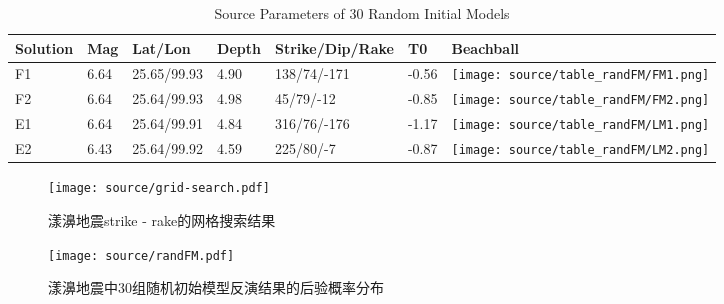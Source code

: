 \begin{table}[h]
    \centering
    \caption{Source Parameters of 30 Random Initial Models}
    \label{tab:yangbi-2}
      \centering%
      \begin{tabular}{m{1.5cm}<{\centering}m{1.5cm}<{\centering}m{2cm}<{\centering}m{1cm}<{\centering}m{2cm}<{\centering}m{1cm}<{\centering}m{2cm}<{\centering}}
  
      \toprule
      Solution   & Mag & Lat/Lon & Depth & Strike/Dip/Rake & T0 & Beachball    \\
  
      \midrule
      F1 & 6.64 & 25.65/99.93 & 4.90 & 138/74/-171 & -0.56 & \texttt{[image: source/table\_randFM/FM1.png]} \\
      
      F2 & 6.64 & 25.64/99.93 & 4.98 & 45/79/-12 & -0.85 & \texttt{[image: source/table\_randFM/FM2.png]} \\
      
      E1 & 6.64 & 25.64/99.91 & 4.84 & 316/76/-176 & -1.17 & \texttt{[image: source/table\_randFM/LM1.png]} \\
      
      E2 & 6.43 & 25.64/99.92 & 4.59 & 225/80/-7 &  -0.87 & \texttt{[image: source/table\_randFM/LM2.png]} \\
      
      \bottomrule
    \end{tabular}
\end{table}

\begin{figure}[h]
    \centering
    \texttt{[image: source/grid-search.pdf]}
    \caption{漾濞地震strike - rake的网格搜索结果}
    \label{fig:grid-search}
\end{figure}

\begin{figure}[h]
    \centering
    \texttt{[image: source/randFM.pdf]}
    \caption{漾濞地震中30组随机初始模型反演结果的后验概率分布}
    \label{fig:randFM}
\end{figure}



